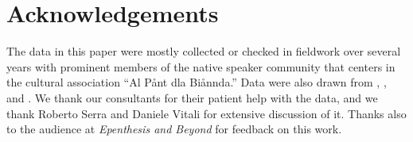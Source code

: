 \documentclass[output=paper,colorlinks,citecolor=brown]{langscibook}
\begin{document}
 

\section*{Acknowledgements}
The data in this paper were mostly collected or checked in fieldwork over several years with prominent members of the native speaker community that centers in the cultural association ``Al Pånt dla Biånnda.” Data were also drawn from \citet{caneparivitali:bolognese}, \citet{bologneseprimertwo}, and \citet{leprivitali:dict}. We thank our consultants for their patient help with the data, and we thank Roberto Serra and Daniele Vitali for extensive discussion of it. Thanks also to the audience at \textit{Epenthesis and Beyond} for feedback on this work.


{\sloppy\printbibliography[heading=subbibliography,notkeyword=this]}
\end{document}
